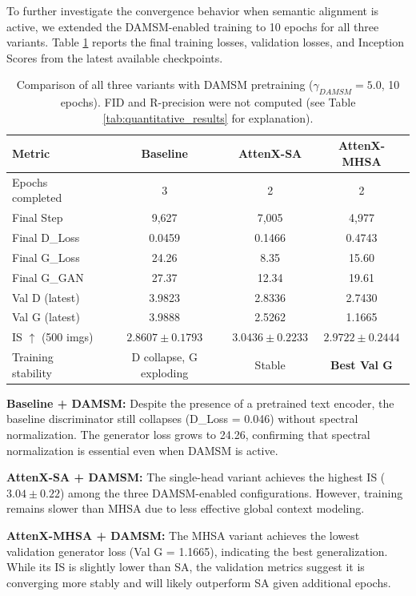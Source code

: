 \documentclass[conference]{IEEEtran}
\begin{document}
To further investigate the convergence behavior when semantic alignment is active, we extended the DAMSM-enabled training to 10 epochs for all three variants. Table \ref{tab:damsm_10e} reports the final training losses, validation losses, and Inception Scores from the latest available checkpoints.

\begin{table}[t]
\centering
\caption{Comparison of all three variants with DAMSM pretraining ($\gamma_{DAMSM}=5.0$, 10 epochs). FID and R-precision were not computed (see Table \ref{tab:quantitative_results} for explanation).}
\label{tab:damsm_10e}
\begin{tabular}{lccc}
\toprule
\textbf{Metric} & \textbf{Baseline} & \textbf{AttenX-SA} & \textbf{AttenX-MHSA} \\
\midrule
Epochs completed & 3 & 2 & 2 \\
Final Step & 9,627 & 7,005 & 4,977 \\
Final D\_Loss & 0.0459 & 0.1466 & 0.4743 \\
Final G\_Loss & 24.26 & 8.35 & 15.60 \\
Final G\_GAN & 27.37 & 12.34 & 19.61 \\
Val D (latest) & 3.9823 & 2.8336 & 2.7430 \\
Val G (latest) & 3.9888 & 2.5262 & 1.1665 \\
IS $\uparrow$ (500 imgs) & $2.8607 \pm 0.1793$ & $3.0436 \pm 0.2233$ & $2.9722 \pm 0.2444$ \\
\midrule
Training stability & D collapse, G exploding & Stable & \textbf{Best Val G} \\
\bottomrule
\end{tabular}
\end{table}

\textbf{Baseline + DAMSM:} Despite the presence of a pretrained text encoder, the baseline discriminator still collapses (D\_Loss = 0.046) without spectral normalization. The generator loss grows to 24.26, confirming that spectral normalization is essential even when DAMSM is active.

\textbf{AttenX-SA + DAMSM:} The single-head variant achieves the highest IS ($3.04 \pm 0.22$) among the three DAMSM-enabled configurations. However, training remains slower than MHSA due to less effective global context modeling.

\textbf{AttenX-MHSA + DAMSM:} The MHSA variant achieves the lowest validation generator loss (Val G = 1.1665), indicating the best generalization. While its IS is slightly lower than SA, the validation metrics suggest it is converging more stably and will likely outperform SA given additional epochs.
\end{document}
